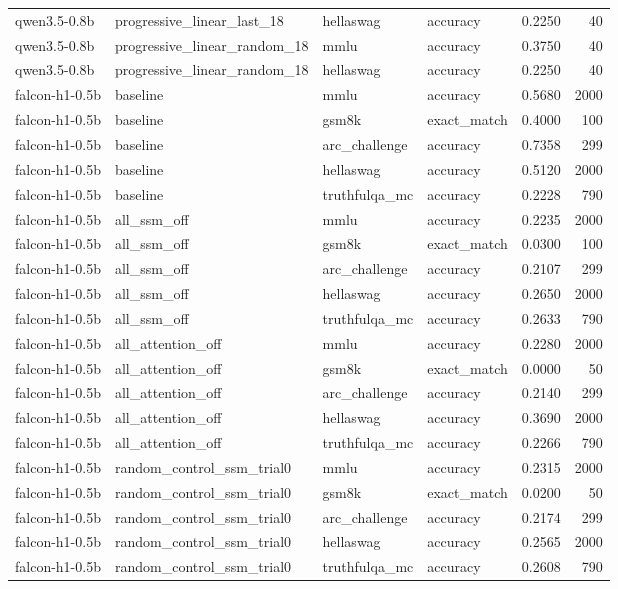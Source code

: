 \begin{tabular}{llllrr}
qwen3.5-0.8b & progressive_linear_last_18 & hellaswag & accuracy & 0.2250 & 40 \\
qwen3.5-0.8b & progressive_linear_random_18 & mmlu & accuracy & 0.3750 & 40 \\
qwen3.5-0.8b & progressive_linear_random_18 & hellaswag & accuracy & 0.2250 & 40 \\
falcon-h1-0.5b & baseline & mmlu & accuracy & 0.5680 & 2000 \\
falcon-h1-0.5b & baseline & gsm8k & exact_match & 0.4000 & 100 \\
falcon-h1-0.5b & baseline & arc_challenge & accuracy & 0.7358 & 299 \\
falcon-h1-0.5b & baseline & hellaswag & accuracy & 0.5120 & 2000 \\
falcon-h1-0.5b & baseline & truthfulqa_mc & accuracy & 0.2228 & 790 \\
falcon-h1-0.5b & all_ssm_off & mmlu & accuracy & 0.2235 & 2000 \\
falcon-h1-0.5b & all_ssm_off & gsm8k & exact_match & 0.0300 & 100 \\
falcon-h1-0.5b & all_ssm_off & arc_challenge & accuracy & 0.2107 & 299 \\
falcon-h1-0.5b & all_ssm_off & hellaswag & accuracy & 0.2650 & 2000 \\
falcon-h1-0.5b & all_ssm_off & truthfulqa_mc & accuracy & 0.2633 & 790 \\
falcon-h1-0.5b & all_attention_off & mmlu & accuracy & 0.2280 & 2000 \\
falcon-h1-0.5b & all_attention_off & gsm8k & exact_match & 0.0000 & 50 \\
falcon-h1-0.5b & all_attention_off & arc_challenge & accuracy & 0.2140 & 299 \\
falcon-h1-0.5b & all_attention_off & hellaswag & accuracy & 0.3690 & 2000 \\
falcon-h1-0.5b & all_attention_off & truthfulqa_mc & accuracy & 0.2266 & 790 \\
falcon-h1-0.5b & random_control_ssm_trial0 & mmlu & accuracy & 0.2315 & 2000 \\
falcon-h1-0.5b & random_control_ssm_trial0 & gsm8k & exact_match & 0.0200 & 50 \\
falcon-h1-0.5b & random_control_ssm_trial0 & arc_challenge & accuracy & 0.2174 & 299 \\
falcon-h1-0.5b & random_control_ssm_trial0 & hellaswag & accuracy & 0.2565 & 2000 \\
falcon-h1-0.5b & random_control_ssm_trial0 & truthfulqa_mc & accuracy & 0.2608 & 790 \\

\end{tabular}
